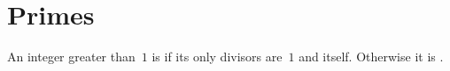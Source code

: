 \documentclass{ibl}
\begin{document}











\section{Primes}
\begin{df}
An integer greater than~$1$
is  if its only divisors are~$1$ and itself.
Otherwise it is .  
\end{df}
\end{document}
